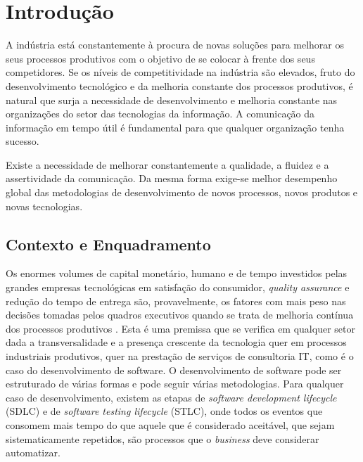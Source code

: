 \chapter{Introdução}
\label{Ch:Introducao}

\hspace{1cm}A indústria está constantemente à procura de novas soluções para melhorar os seus processos produtivos com o objetivo de se colocar à frente dos seus competidores. Se os níveis de competitividade na indústria são elevados, fruto do desenvolvimento tecnológico e da melhoria constante dos processos produtivos, é natural que surja a necessidade de desenvolvimento e melhoria constante nas organizações do setor das tecnologias da informação. A comunicação da informação em tempo útil é fundamental para que qualquer organização tenha sucesso.

\hspace{1cm}Existe a necessidade de melhorar constantemente a qualidade, a fluidez e a assertividade da comunicação. Da mesma forma exige-se melhor desempenho global das metodologias de desenvolvimento de novos processos, novos produtos e novas tecnologias.

\section{Contexto e Enquadramento}

\hspace{1cm}Os enormes volumes de capital monetário, humano e  de tempo investidos pelas grandes empresas tecnológicas em satisfação do consumidor, \textit{quality assurance} e redução do tempo de entrega são, provavelmente, os fatores com mais peso nas decisões tomadas pelos quadros executivos quando se trata de melhoria contínua dos processos produtivos \cite{goldratt2016goal}. Esta é uma premissa que se verifica em qualquer setor dada a transversalidade e a presença crescente da tecnologia quer em processos industriais produtivos, quer na prestação de serviços de consultoria IT, como é o caso do desenvolvimento de software. O desenvolvimento de software pode ser estruturado de várias formas e pode seguir várias metodologias. Para qualquer caso de desenvolvimento, existem as etapas de \textit{software development lifecycle} (SDLC) e de \textit{software testing lifecycle} (STLC), onde todos os eventos que consomem mais tempo do que aquele que é considerado aceitável, que sejam sistematicamente repetidos, são processos que o \textit{business} deve considerar automatizar.

